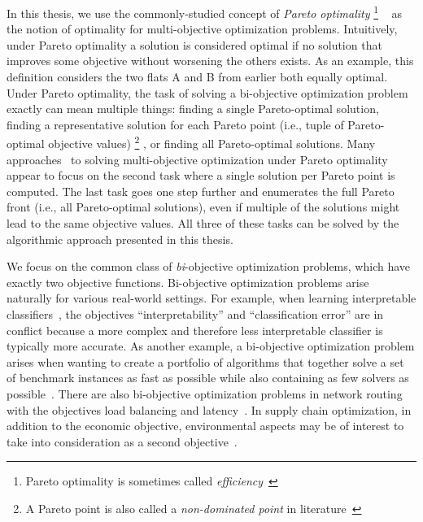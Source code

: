 In this thesis, we use the commonly-studied concept of \emph{Pareto optimality}%
\footnote{Pareto optimality is sometimes called \emph{efficiency}~\autocite{Ehrgott2005-2,DBLP:journals/siamjo/SantisENR20}}%
~\autocite{Ehrgott2005-2} as the notion of optimality for multi-objective optimization problems.
Intuitively, under Pareto optimality a solution is considered optimal if no solution that improves some objective without worsening the others exists.
As an example, this definition considers the two flats A and B from earlier both equally optimal.
Under Pareto optimality, the task of solving a bi-objective optimization problem exactly can mean multiple things:
finding a single Pareto-optimal solution, finding a representative solution for each Pareto point (i.e., tuple of Pareto-optimal objective values)%
\footnote{A Pareto point is also called a \emph{non-dominated point} in literature~\autocite{Ehrgott2005-2}}%
, or finding all Pareto-optimal solutions.
Many approaches~\autocite{DBLP:conf/cp/SohBTB17,DBLP:conf/cp/JanotaMSM21,DBLP:conf/ijcai/Terra-NevesLM18a} to solving multi-objective optimization under Pareto optimality appear to focus on the second task where a single solution per Pareto point is computed.
The last task goes one step further and enumerates the full Pareto front (i.e., all Pareto-optimal solutions), even if multiple of the solutions might lead to the same objective values.
All three of these tasks can be solved by the algorithmic approach presented in this thesis.

We focus on the common class of \emph{bi}-objective optimization problems, which have exactly two objective functions.
Bi-objective optimization problems arise naturally for various real-world settings.
For example, when learning interpretable classifiers~\autocites{DBLP:conf/ijcai/Ignatiev0NS21,DBLP:conf/cp/MaliotovM18,DBLP:conf/ijcai/NarodytskaIPM18,DBLP:conf/ijcai/Hu0HH20,DBLP:journals/corr/abs-2010-09919,DBLP:conf/cp/YuISB20,DBLP:conf/aaai/Ignatiev0S021,DBLP:conf/cade/IgnatievPNM18}, the objectives ``interpretability'' and ``classification error'' are in conflict because a more complex and therefore less interpretable classifier is typically more accurate.
As another example, a bi-objective optimization problem arises when wanting to create a portfolio of algorithms that together solve a set of benchmark instances as fast as possible while also containing as few solvers as possible~\autocite{DBLP:conf/cp/JanotaMSM21}.
There are also bi-objective optimization problems in network routing with the objectives load balancing and latency~\autocite{SilverioEtAl2022biobjectiveoptimization}.
In supply chain optimization, in addition to the economic objective, environmental aspects may be of interest to take into consideration as a second objective~\autocites{DBLP:journals/cce/Pinto-VarelaBN11,DBLP:journals/candie/TautenhainBN19}.

